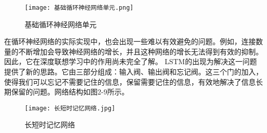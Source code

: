 \begin{figure}[hbt]
	\centering
	\texttt{[image: 基础循环神经网络单元.png]}
	\caption{基础循环神经网络单元}
	\label{f.example}
\end{figure}

在循环神经网络的实际实现中，也会出现一些难以有效避免的问题。例如，连接数量的不断增加会导致神经网络的增长，并且这种网络的增长无法得到有效的抑制。因此，它在深度联想学习中的作用尚未完全了解。 LSTM\cite{hochreiter1997long}的出现为解决这一问题提供了新的思路。它由三部分组成：输入阀、输出阀和忘记阀。这三个门的加入，使得我们可以忘记不需要记住的信息，保留需要记住的信息，有效地解决了信息长期保留的问题。网络结构如图2-9所示。

\begin{figure}[hbt]
	\centering
	\texttt{[image: 长短时记忆网络.jpg]}
	\caption{长短时记忆网络}
	\label{f.example}
\end{figure}


